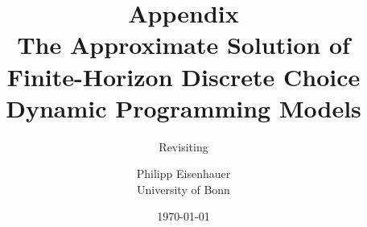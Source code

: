 \title{{\Huge{Appendix}}\\\vspace{1.5cm} The Approximate Solution of Finite-Horizon Discrete Choice Dynamic Programming Models}
\subtitle{Revisiting  \citet{Keane.1994}}


\author{Philipp Eisenhauer\\
University of Bonn}

\date{\today}
